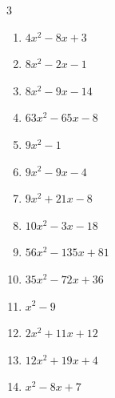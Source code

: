 \begin{multicols}{3}
\begin{enumerate}
  \item $4x^{2}-8x+3$

        \phantom{$=(2x-3)(2x-1)$}

  \item $8x^{2}-2x-1$

        \phantom{$=(4x+1)(2x-1)$}

  \item $8x^{2}-9x-14$

        \phantom{$=(8x+7)(x-2)$}

  \item $63x^{2}-65x-8$

        \phantom{$=(7x-8)(9x+1)$}

  \item $9x^{2}-1$

        \phantom{$=(3x-1)(3x+1)$}

  \item $9x^{2}-9x-4$

        \phantom{$=(3x+1)(3x-4)$}

  \item $9x^{2}+21x-8$

        \phantom{$=(3x+8)(3x-1)$}

  \item $10x^{2}-3x-18$

        \phantom{$=(5x+6)(2x-3)$}

  \item $56x^{2}-135x+81$

        \phantom{$=(7x-9)(8x-9)$}

\columnbreak %

\resetques

  \item $35x^{2}-72x+36$

        \phantom{$=(7x-6)(5x-6)$}

  \item $x^{2}-9$

        \phantom{$=(x-3)(x+3)$}

  \item $2x^{2}+11x+12$

        \phantom{$=(2x+3)(x+4)$}

  \item $12x^{2}+19x+4$

        \phantom{$=(4x+1)(3x+4)$}

  \item $x^{2}-8x+7$

        \phantom{$=(x-7)(x-1)$}


\end{enumerate}
\end{multicols}
